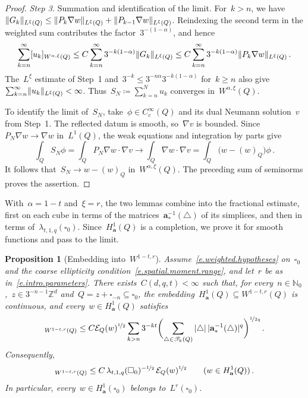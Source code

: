 \documentclass[11pt,letterpaper]{article}
\numberwithin{equation}{section}
\newtheorem{proposition}[theorem]{Proposition}
\theoremstyle{definition}
\newcommand{\N}{\mathbb{N}}
\newcommand{\Zd}{\mathbb{Z}^d}
\renewcommand{\a}{\mathbf{a}}
\newcommand{\nf}{\nicefrac}
\newcommand{\cu}{\square}
\DeclarePairedDelimiter{\norm}{\lVert}{\rVert}
\renewcommand{\subset}{\subseteq}
\newcommand{\Ener}{\mathcal E}
\begin{document}
\begin{proof}
\smallskip

\emph{Step 3.} Summation and identification of the limit. For~$k>n$, we have~$\norm{G_k}_{L^\xi(Q)}\leq\norm{P_k\nabla w}_{L^\xi(Q)}+\norm{P_{k-1}\nabla w}_{L^\xi(Q)}$. Reindexing the second term in the weighted sum contributes the factor~$3^{-(1-\alpha)}$, and hence
\begin{equation*}
	\sum_{k=n}^\infty[u_k]_{W^{\alpha,\xi}(Q)}\leq C\sum_{k=n}^\infty3^{-k(1-\alpha)}\norm{G_k}_{L^\xi(Q)}\leq C\sum_{k=n}^\infty3^{-k(1-\alpha)}\norm{P_k\nabla w}_{L^\xi(Q)}\,.
\end{equation*}
The~$L^\xi$ estimate of Step~1 and~$3^{-k}\leq3^{-n\alpha}3^{-k(1-\alpha)}$ for~$k\geq n$ also give~$\sum_{k=n}^\infty\norm{u_k}_{L^\xi(Q)}<\infty$. Thus~$S_N\coloneqq\sum_{k=n}^N u_k$ converges in~$W^{\alpha,\xi}(Q)$.

\smallskip

To identify the limit of~$S_N$, take~$\phi\in C_c^\infty(Q)$ and its dual Neumann solution~$v$ from Step~1. The reflected datum is smooth, so~$\nabla v$ is bounded. Since~$P_N\nabla w\to\nabla w$ in~$L^1(Q)$, the weak equations and integration by parts give
\begin{equation*}
	\int_Q S_N\phi=\int_Q P_N\nabla w\cdot\nabla v\longrightarrow\int_Q\nabla w\cdot\nabla v=\int_Q\bigl(w-(w)_Q\bigr)\phi\,.
\end{equation*}
It follows that~$S_N\to w-(w)_Q$ in~$W^{\alpha,\xi}(Q)$. The preceding sum of seminorms proves the assertion.
\end{proof}

With~$\alpha=1-t$ and~$\xi=r$, the two lemmas combine into the fractional estimate, first on each cube in terms of the matrices~$\a_*^{-1}(\triangle)$ of its simplices, and then in terms of~$\lambda_{t,1,q}(\cu_0)$. Since~$H^1_\a(Q)$ is a completion, we prove it for smooth functions and pass to the limit.

\begin{proposition}[Embedding into~$W^{1-t,r}$]
\label{p.lower.fractional}
Assume~\eqref{e.weighted.hypotheses} on~$\cu_0$ and the coarse ellipticity condition~\eqref{e.spatial.moment.range}, and let~$r$ be as in~\eqref{e.intro.parameters}. There exists~$C(d,q,t)<\infty$ such that, for every~$n\in\N_0$,~$z\in3^{-n-1}\Zd$ and~$Q=z+\cu_{-n}\subset\cu_0$, the embedding~$H^1_\a(Q)\subset W^{1-t,r}(Q)$ is continuous, and every~$w\in H^1_\a(Q)$ satisfies
\begin{equation}
	[w]_{W^{1-t,r}(Q)}\leq C\Ener_Q(w)^{\nf12}\sum_{k>n}3^{-kt}\biggl(\sum_{\triangle\in\mathscr T_k(Q)}|\triangle|\,|\a_*^{-1}(\triangle)|^q\biggr)^{\nf1{2q}}\,.
	\label{e.lower.fractional.local}
\end{equation}
Consequently,
\begin{equation}
	[w]_{W^{1-t,r}(Q)}\leq C\,\lambda_{t,1,q}(\cu_0)^{-\nf12}\,\Ener_Q(w)^{\nf12}\qquad(w\in H^1_\a(Q))\,.
	\label{e.lower.fractional}
\end{equation}
In particular, every~$w\in H^1_\a(\cu_0)$ belongs to~$L^r(\cu_0)$.
\end{proposition}
\end{document}
